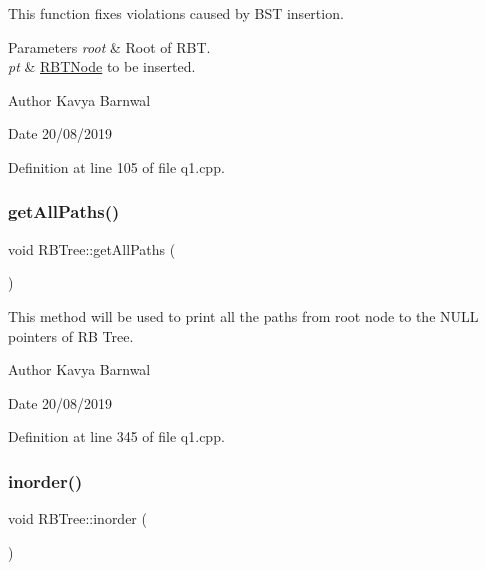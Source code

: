 This function fixes violations caused by B\+ST insertion. 
\begin{DoxyParams}{Parameters}
{\em root} & Root of R\+BT. \\
\hline
{\em pt} & \hyperlink{struct_r_b_t_node}{R\+B\+T\+Node} to be inserted. \\
\hline
\end{DoxyParams}
\begin{DoxyAuthor}{Author}
Kavya Barnwal 
\end{DoxyAuthor}
\begin{DoxyDate}{Date}
20/08/2019 
\end{DoxyDate}


Definition at line 105 of file q1.\+cpp.

\mbox{\label{class_r_b_tree_a12c03168e62443644c5043fd2ffb5f39}} 
\subsubsection{\texorpdfstring{get\+All\+Paths()}{getAllPaths()}}
{\footnotesize\ttfamily void R\+B\+Tree\+::get\+All\+Paths (\begin{DoxyParamCaption}{ }\end{DoxyParamCaption})\hspace{0.3cm}{\ttfamily [inline]}}

This method will be used to print all the paths from root node to the N\+U\+LL pointers of RB Tree. \begin{DoxyAuthor}{Author}
Kavya Barnwal 
\end{DoxyAuthor}
\begin{DoxyDate}{Date}
20/08/2019 
\end{DoxyDate}


Definition at line 345 of file q1.\+cpp.

\mbox{\label{class_r_b_tree_aff8e5c4479e6708da9a6cbfc276836a3}} 
\subsubsection{\texorpdfstring{inorder()}{inorder()}}
{\footnotesize\ttfamily void R\+B\+Tree\+::inorder (\begin{DoxyParamCaption}{ }\end{DoxyParamCaption})\hspace{0.3cm}{\ttfamily [inline]}}

